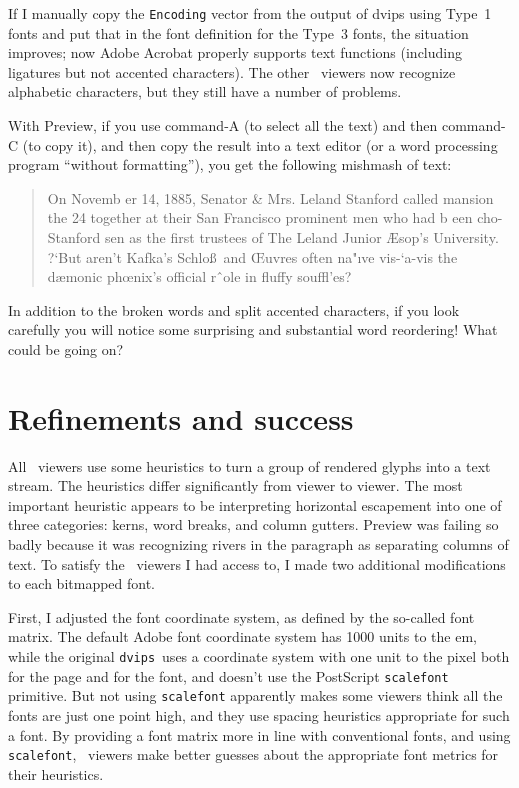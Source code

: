 \documentclass[final]{ltugboat}
\def\PDF{\acro{PDF}}
\def\dvips{\texttt{dvips}}
\begin{document}
If I manually copy the \texttt{Encoding} vector from
the output of dvips using Type~1 fonts and put that
in the font definition for the Type~3 fonts, the situation
improves; now Adobe Acrobat properly supports text
functions (including ligatures but not accented
characters).  The other \PDF\ viewers now recognize
alphabetic characters, but they still have a number of
problems.

With Preview, if you use command-A
(to select all the text) and then command-C (to copy
it), and then copy the result into a text editor (or
a word processing program ``without formatting''),
you get the following mishmash of text:

\begin{quote}
\raggedright
On Novemb er 14, 1885, Senator \& Mrs. Leland
Stanford called
mansion the 24
together at their San Francisco
prominent men who had
b een cho-
Stanford
sen as the first trustees of The Leland
Junior
{\AE}sop’s
University. ?`But aren’t Kafka’s Schlo\ss\ and
{\OE}uvres often na"ıve vis-`a-vis the dæmonic
ph{\oe}nix’s official rˆole in fluffy souffl'es?
\end{quote}
\noindent
In addition to the broken words and split accented
characters, if you look carefully you will notice
some surprising
and substantial word reordering!  What could
be going on?

\section{Refinements and success}

All \PDF\ viewers use some heuristics
to turn a group of rendered glyphs into a text stream.
The heuristics differ significantly from viewer to
viewer.  The most important heuristic appears to be
interpreting horizontal escapement into one of
three categories: kerns, word breaks, and column
gutters.  Preview was failing so badly because it
was recognizing rivers in the paragraph as separating
columns of text.
To satisfy the \PDF\ viewers I had access to,
I made two additional modifications to each bitmapped font.

First, I adjusted the font coordinate system,
as defined by the so-called font matrix.
The default Adobe font coordinate system has 1000 units
to the em, while the original
\dvips\ uses a coordinate system with one unit to the
pixel both for the page and for the font, and doesn't use
the PostScript \texttt{scalefont} primitive.  But not using
\texttt{scalefont} apparently makes some viewers think all the
fonts are just one point high, and they use spacing heuristics
appropriate for such a font.  By providing a font matrix
more in line with conventional fonts, and using
\texttt{scalefont}, \PDF\ viewers make better guesses about
the appropriate font metrics for their heuristics.
\end{document}
